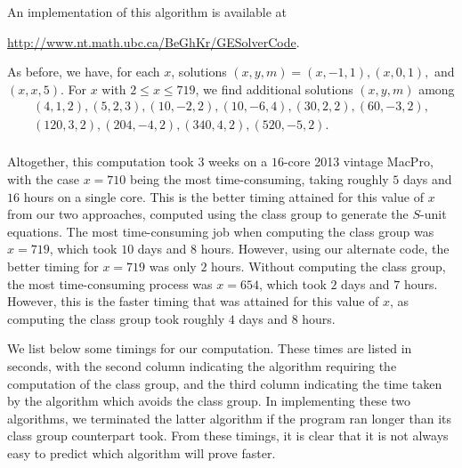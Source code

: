 %

An implementation of this algorithm is available at
\begin{center}
\url{http://www.nt.math.ubc.ca/BeGhKr/GESolverCode}.
\end{center}

As before, we have, for each $x$, solutions $(x,y,m) = (x,-1,1), (x,0,1),$ and $(x,x,5)$. For $x$ with $2 \leq x \leq 719$, we find additional solutions $(x,y,m)$ among 
$$
\begin{array}{c}
(4,1,2), (5,2,3), (10,-2,2), (10,-6,4), (30,2,2), (60,-3,2), \\
(120, 3,2), (204,-4,2), (340, 4,2), (520,-5,2).\\
\end{array}
$$

Altogether, this computation took 3 weeks on a $16$-core 2013 vintage MacPro, with the case $x=710$ being the most time-consuming, taking roughly $5$ days and $16$ hours on a single core. This is the better timing attained for this value of $x$ from our two approaches, computed using the class group to generate the $S$-unit equations. The most time-consuming job when computing the class group was $x = 719$, which took $10$ days and $8$ hours. However, using our alternate code, the better timing for $x = 719$ was only $2$ hours. Without computing the class group, the most time-consuming process was $x = 654$, which took $2$ days and $7$ hours. However, this is the faster timing that was attained for this value of $x$, as computing the class group took roughly $4$ days and $8$ hours. 

We list below some timings for our computation. These times are listed in seconds, with the second column indicating the algorithm requiring the computation of the class group, and the third column indicating the time taken by the algorithm which avoids the class group. In implementing these two algorithms, we terminated the latter algorithm if the program ran longer than its class group counterpart took. From these timings, it is clear that it is not always easy to predict which algorithm will prove faster. 

